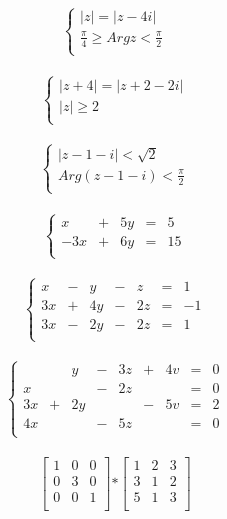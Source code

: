 \documentclass[a4paper]{article}
\begin{document}
$$ \begin{cases}
   |z| = |z-4i|\\
   \frac{\pi}{4} \geq Arg z < \frac{\pi}{2}\\
   \end{cases} 
$$\\
   
$$ \begin{cases}
   |z+4| = |z+2-2i|\\
   |z| \geq 2\\
   \end{cases} 
$$\\
   
$$ \begin{cases}
   |z-1-i| < \sqrt{2}\\
   Arg(z-1-i) < \frac{\pi}{2}\\
   \end{cases} 
$$\\

$$ \left\{ \begin{array}{rrrrr}
   x & + & 5y & = & 5\\
   -3x & + & 6y & = & 15\\
   \end{array}
\right.$$\\

$$ \left\{ \begin{array}{rrrrrrr}
   x & - & y & - & z & = & 1\\
   3x & + & 4y & - & 2z & = & -1\\
   3x & - & 2y & - & 2z & = & 1\\
   \end{array}
\right.$$\\


$$ \left\{ \begin{array}{rrrrrrrrr}
   \ & \ & y & - & 3z & + & 4v & = & 0\\
   x & \ & \ & - & 2z & \ & \ & = & 0\\
   3x & + & 2y & \ & \ & - & 5v & = & 2\\
   4x & \ & \ & - & 5z & \ & \ & = & 0\\ 
   \end{array}
\right.$$\\

$$
\left[ \begin{array}{ccc}
1 & 0 & 0 \\
0 & 3 & 0 \\
0 & 0 & 1 \\
\end{array} \right] 
\mathbf{*}
\left[ \begin{array}{ccc}
1 & 2 & 3 \\
3 & 1 & 2 \\
5 & 1 & 3 \\
\end{array} \right]
$$\\
\end{document}
